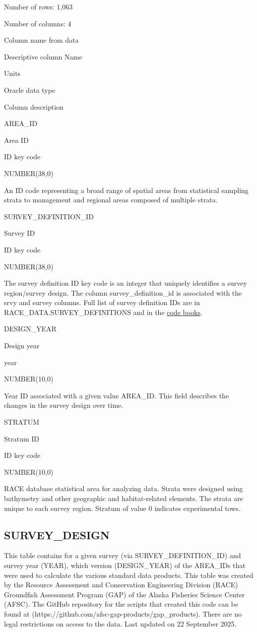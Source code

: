 \documentclass[
  letterpaper,
  oneside,
  open=any]{scrbook}
\begin{document}
Number of rows: 1,063

Number of columns: 4

Column name from data

Descriptive column Name

Units

Oracle data type

Column description

AREA\_ID

Area ID

ID key code

NUMBER(38,0)

An ID code representing a broad range of spatial areas from statistical
sampling strata to management and regional areas composed of multiple
strata.

SURVEY\_DEFINITION\_ID

Survey ID

ID key code

NUMBER(38,0)

The survey definition ID key code is an integer that uniquely identifies
a survey region/survey design. The column survey\_definition\_id is
associated with the srvy and survey columns. Full list of survey
definition IDs are in RACE\_DATA.SURVEY\_DEFINITIONS and in the
\href{https://www.fisheries.noaa.gov/resource/document/groundfish-survey-species-code-manual-and-data-codes-manual}{code
books}.

DESIGN\_YEAR

Design year

year

NUMBER(10,0)

Year ID associated with a given value AREA\_ID. This field describes the
changes in the survey design over time.

STRATUM

Stratum ID

ID key code

NUMBER(10,0)

RACE database statistical area for analyzing data. Strata were designed
using bathymetry and other geographic and habitat-related elements. The
strata are unique to each survey region. Stratum of value 0 indicates
experimental tows.

\subsection{SURVEY\_DESIGN}\label{survey_design}

This table contains for a given survey (via SURVEY\_DEFINITION\_ID) and
survey year (YEAR), which version (DESIGN\_YEAR) of the AREA\_IDs that
were used to calculate the various standard data products. This table
was created by the Resource Assessment and Conservation Engineering
Division (RACE) Groundfish Assessment Program (GAP) of the Alaska
Fisheries Science Center (AFSC). The GitHub repository for the scripts
that created this code can be found at
(https://github.com/afsc-gap-products/gap\_products). There are no legal
restrictions on access to the data. Last updated on 22 September 2025.
\end{document}
